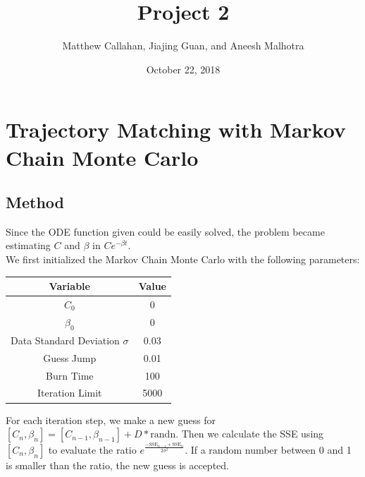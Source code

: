 \documentclass{article}
\title{Project 2}
\author{Matthew Callahan, Jiajing Guan, and Aneesh Malhotra}
\date{October 22, 2018}
\begin{document}
\maketitle
\section{Trajectory Matching with Markov Chain Monte Carlo}
\subsection{Method}
Since the ODE function given could be easily solved, the problem became estimating $C$ and $\beta$ in $Ce^{-\beta t}$.\\
We first initialized the Markov Chain Monte Carlo with the following parameters:\\
\begin{center}
\begin{tabular}{|c|c|}
\hline
Variable & Value\\
\hline
$C_0$ & 0\\
$\beta_0$ & 0\\
Data Standard Deviation $\sigma$ & 0.03\\
Guess Jump & 0.01\\
Burn Time & 100\\
Iteration Limit & 5000\\
\hline
\end{tabular}
\end{center}
For each iteration step, we make a new guess for $[C_n,\beta_n]=[C_{n-1},\beta_{n-1}]+D*\text{randn}$. Then we calculate the SSE using $[C_n,\beta_n]$ to evaluate the ratio $e^{\frac{-\text{SSE}_{n-1}+\text{SSE}_n}{2\sigma^2}}$. If a random number between 0 and 1 is smaller than the ratio, the new guess is accepted. \\
\end{document}
